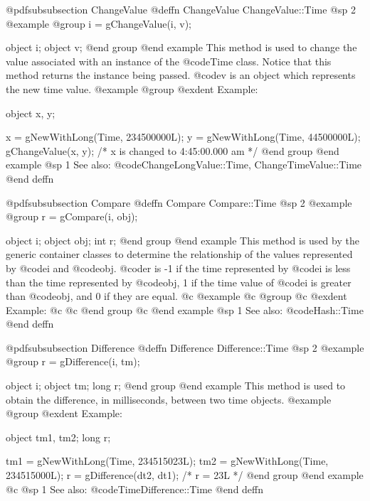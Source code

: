 @pdfsubsubsection {ChangeValue}
@deffn {ChangeValue} ChangeValue::Time
@sp 2
@example
@group
i = gChangeValue(i, v);

object  i;
object  v;
@end group
@end example
This method is used to change the value associated with an instance of
the @code{Time} class.  Notice that this method returns the instance
being passed.  @code{v} is an object which represents the new time value.
@example
@group
@exdent Example:

object  x, y;

x = gNewWithLong(Time, 234500000L);
y = gNewWithLong(Time, 44500000L);
gChangeValue(x, y);    /*  x is changed to 4:45:00.000 am  */
@end group
@end example
@sp 1
See also:  @code{ChangeLongValue::Time, ChangeTimeValue::Time}
@end deffn










@pdfsubsubsection {Compare}
@deffn {Compare} Compare::Time
@sp 2
@example
@group
r = gCompare(i, obj);

object  i;
object  obj;
int     r;
@end group
@end example
This method is used by the generic container classes to determine
the relationship of the values represented by @code{i} and @code{obj}. 
@code{r} is -1 if the time represented by @code{i} is less than
the time represented by @code{obj}, 1 if the time value of @code{i}
is greater than @code{obj}, and 0 if they are equal.
@c @example
@c @group
@c @exdent Example:
@c
@c @end group
@c @end example
@sp 1
See also:  @code{Hash::Time}
@end deffn







@pdfsubsubsection {Difference}
@deffn {Difference} Difference::Time
@sp 2
@example
@group
r = gDifference(i, tm);

object  i;
object  tm;
long    r;
@end group
@end example
This method is used to obtain the difference, in milliseconds,
between two time objects.  
@example
@group
@exdent Example:

object  tm1, tm2;
long    r;

tm1 = gNewWithLong(Time, 234515023L);
tm2 = gNewWithLong(Time, 234515000L);
r = gDifference(dt2, dt1);    /*  r = 23L  */
@end group
@end example
@c @sp 1
See also:  @code{TimeDifference::Time}
@end deffn







